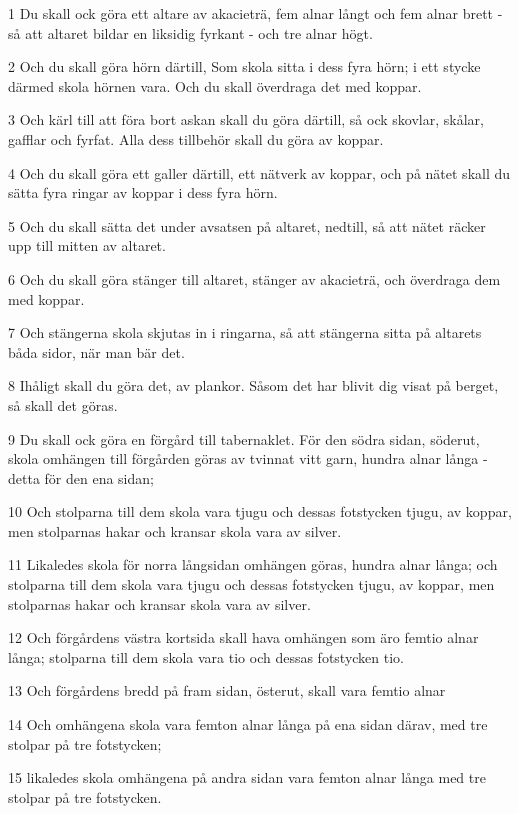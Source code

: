 \par 1 Du skall ock göra ett altare av akacieträ, fem alnar långt och fem alnar brett - så att altaret bildar en liksidig fyrkant - och tre alnar högt.
\par 2 Och du skall göra hörn därtill, Som skola sitta i dess fyra hörn; i ett stycke därmed skola hörnen vara. Och du skall överdraga det med koppar.
\par 3 Och kärl till att föra bort askan skall du göra därtill, så ock skovlar, skålar, gafflar och fyrfat. Alla dess tillbehör skall du göra av koppar.
\par 4 Och du skall göra ett galler därtill, ett nätverk av koppar, och på nätet skall du sätta fyra ringar av koppar i dess fyra hörn.
\par 5 Och du skall sätta det under avsatsen på altaret, nedtill, så att nätet räcker upp till mitten av altaret.
\par 6 Och du skall göra stänger till altaret, stänger av akacieträ, och överdraga dem med koppar.
\par 7 Och stängerna skola skjutas in i ringarna, så att stängerna sitta på altarets båda sidor, när man bär det.
\par 8 Ihåligt skall du göra det, av plankor. Såsom det har blivit dig visat på berget, så skall det göras.
\par 9 Du skall ock göra en förgård till tabernaklet. För den södra sidan, söderut, skola omhängen till förgården göras av tvinnat vitt garn, hundra alnar långa - detta för den ena sidan;
\par 10 Och stolparna till dem skola vara tjugu och dessas fotstycken tjugu, av koppar, men stolparnas hakar och kransar skola vara av silver.
\par 11 Likaledes skola för norra långsidan omhängen göras, hundra alnar långa; och stolparna till dem skola vara tjugu och dessas fotstycken tjugu, av koppar, men stolparnas hakar och kransar skola vara av silver.
\par 12 Och förgårdens västra kortsida skall hava omhängen som äro femtio alnar långa; stolparna till dem skola vara tio och dessas fotstycken tio.
\par 13 Och förgårdens bredd på fram sidan, österut, skall vara femtio alnar
\par 14 Och omhängena skola vara femton alnar långa på ena sidan därav, med tre stolpar på tre fotstycken;
\par 15 likaledes skola omhängena på andra sidan vara femton alnar långa med tre stolpar på tre fotstycken.
